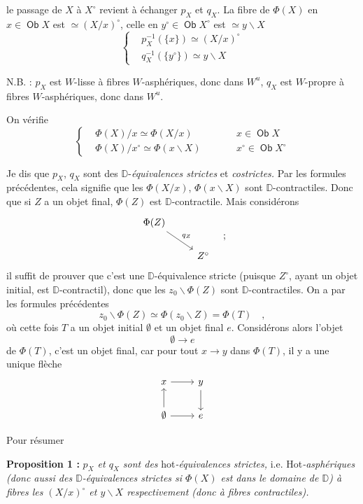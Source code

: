 \documentclass[11pt]{article}
\newcommand{\printedpage}[1]{\marginpar{\footnotesize p.~#1}}
\newcommand{\msp}[1]{\marginpar{\footnotesize [#1]}}
\newcommand{\D}{\mathbb{D}}
\newcommand{\Ob}{\mathop{\mathsf{Ob}}}
\newcommand{\bs}{\backslash}
\begin{document}
\printedpage{44}
le passage de $X$ à $X^\circ$ revient à échanger $p_X$ et $q_X$. La fibre de $\Phi(X)$ en $x \in \Ob X$ est $\simeq (X/x)^\circ$, celle en $y^\circ \in \Ob X^\circ$ est $\simeq y\bs X$
\[
\left\{
\begin{aligned}
&p_X^{-1}(\{x\}) \simeq (X/x)^\circ\\
&q_X^{-1}(\{y^\circ\}) \simeq y\bs X
\end{aligned}
\right.
\]

N.B. : $p_X$ est $W$-lisse à fibres $W$-asphériques, donc dans $W^u$, $q_X$ est $W$-propre à fibres $W$-asphériques, donc dans $W^u$.

\msp{page 74}

On vérifie
\[
\left\{
\begin{aligned}
&\Phi(X)/x \simeq \Phi(X/x) &\qquad& x \in \Ob X\\
&\Phi(X)/x^\circ \simeq \Phi(x\bs X) &\qquad& x^\circ \in \Ob X^\circ
\end{aligned}
\right.
\]

Je dis que $p_X$, $q_X$ sont des $\D$-\textit{équivalences strictes} et \textit{costrictes.} Par les formules précédentes, cela signifie que les $\Phi(X/x)$, $\Phi(x\bs X)$ sont $\D$-contractiles. Donc que si $Z$ a un objet final, $\Phi(Z)$ est $\D$-contractile. Mais considérons
\[
\begin{tikzcd}
\Phi(Z) \arrow[dr, "q_Z"] & \\
& Z^\circ
\end{tikzcd}
\quad ;
\]
il suffit de prouver que c'est une $\D$-équivalence stricte (puisque $Z^\circ$, ayant un objet initial, est $\D$-contractil), donc que les $z_0\bs\Phi(Z)$ sont $\D$-contractiles. On a par les formules précédentes %
\[
z_0\bs\Phi(Z) \simeq \Phi(z_0\bs Z) = \Phi(T) \quad ,
\]
où cette fois $T$ a un objet initial $\emptyset$ et un objet final $e$. Considérons alors l'objet
\[
\emptyset \longrightarrow e
\]
de $\Phi(T)$, c'est un objet final, car pour tout $x \to y$ dans $\Phi(T)$, il y a une unique flèche
\[
\begin{tikzcd}
x \arrow[r] & y \arrow[d] \\
\emptyset \arrow[u] \arrow[r] & e
\end{tikzcd}
\]

\printedpage{45}
\msp{page 75}

Pour résumer

\textbf{Proposition 1 :} \textit{$p_X$ et $q_X$ sont des} \textsf{hot}\textit{-équivalences strictes,} i.e. \textsf{Hot}\textit{-asphériques (donc aussi des $\D$-équivalences strictes si $\Phi(X)$ est dans le domaine de $\D$) à fibres les $(X/x)^\circ$ et $y\bs X$ respectivement (donc à fibres contractiles).}
\end{document}
